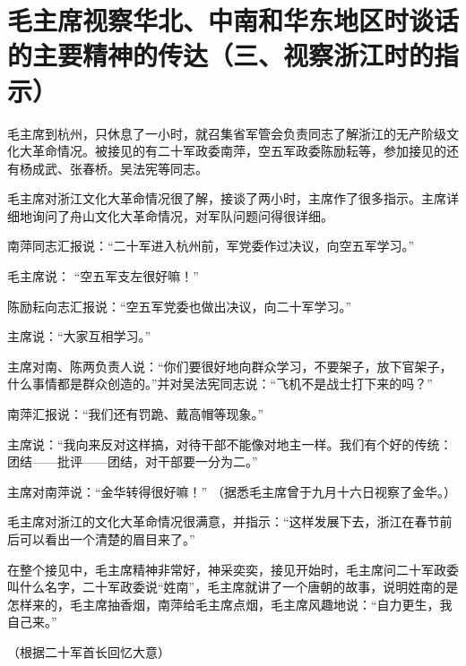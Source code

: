 \section[毛主席视察华北、中南和华东地区时谈话的主要精神的传达（三、视察浙江时的指示）]{毛主席视察华北、中南和华东地区时谈话的主要精神的传达（三、视察浙江时的指示）}



毛主席到杭州，只休息了一小时，就召集省军管会负责同志了解浙江的无产阶级文化大革命情况。被接见的有二十军政委南萍，空五军政委陈励耘等，参加接见的还有杨成武、张春桥。吴法宪等同志。

毛主席对浙江文化大革命情况很了解，接谈了两小时，主席作了很多指示。主席详细地询问了舟山文化大革命情况，对军队问题问得很详细。

南萍同志汇报说：“二十军进入杭州前，军党委作过决议，向空五军学习。”

毛主席说： “空五军支左很好嘛！”

陈励耘向志汇报说：“空五军党委也做出决议，向二十军学习。”

主席说：“大家互相学习。”

主席对南、陈两负责人说：“你们要很好地向群众学习，不要架子，放下官架子，什么事情都是群众创造的。”并对吴法宪同志说：“飞机不是战士打下来的吗？”

南萍汇报说：“我们还有罚跪、戴高帽等现象。”

主席说：“我向来反对这样搞，对待干部不能像对地主一样。我们有个好的传统：团结——批评——团结，对干部要一分为二。”

主席对南萍说：“金华转得很好嘛！”  （据悉毛主席曾于九月十六日视察了金华。）

毛主席对浙江的文化大革命情况很满意，并指示：“这样发展下去，浙江在春节前后可以看出一个清楚的眉目来了。”

在整个接见中，毛主席精神非常好，神采奕奕，接见开始时，毛主席问二十军政委叫什么名字，二十军政委说“姓南”，毛主席就讲了一个唐朝的故事，说明姓南的是怎样来的，毛主席抽香烟，南萍给毛主席点烟，毛主席风趣地说：“自力更生，我自己来。”

{\raggedleft  （根据二十军首长回忆大意）\par}


